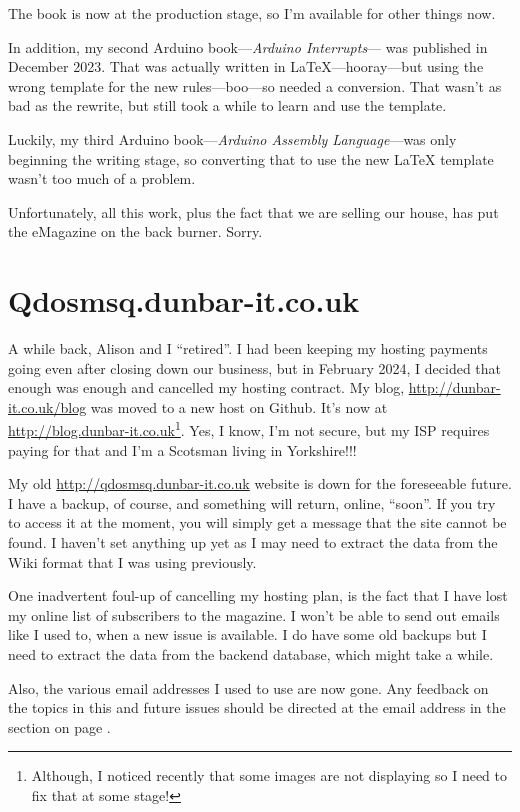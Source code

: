 The book is now at the production stage, so I'm available for other things now.

In addition, my second Arduino book---\emph{Arduino Interrupts}--- was published in December 2023. That was actually written in \LaTeX{}---hooray---but using the wrong template for the new rules---boo---so needed a conversion. That wasn't as bad as the rewrite, but still took a while to learn and use the template.

Luckily, my third Arduino book---\emph{Arduino Assembly Language}---was only beginning the writing stage, so converting that to use the new \LaTeX{} template wasn't too much of a problem.

Unfortunately, all this work, plus the fact that we are selling our house, has put the eMagazine on the back burner. Sorry.


\section{Qdosmsq.dunbar-it.co.uk}

A while back, Alison and I ``retired''. I had been keeping my hosting payments going even after closing down our business, but in February 2024, I decided that enough was enough and cancelled my hosting contract. My blog, \url{http://dunbar-it.co.uk/blog} was moved to a new host on Github. It's now at \url{http://blog.dunbar-it.co.uk}\footnote{Although, I noticed recently that some images are not displaying so I need to fix that at some stage!}. Yes, I know, I'm not secure, but my ISP requires paying for that and I'm a Scotsman living in Yorkshire!!!

My old \url{http://qdosmsq.dunbar-it.co.uk} website is down for the foreseeable future. I have a backup, of course, and something will return, online, ``soon''. If you try to access it at the moment, you will simply get a message that the site cannot be found. I haven't set anything up yet as I may need to extract the data from the Wiki format that I was using previously.

One inadvertent foul-up of cancelling my hosting plan, is the fact that I have lost my online list of subscribers to the magazine. I won't be able to send out emails like I used to, when a new issue is available. I do have some old backups but I need to extract the data from the backend database, which might take a while.

Also, the various email addresses I used to use are now gone. Any feedback on the topics in this and future issues should be directed at the email address in the  section on page \pageref{section: feedback}.


